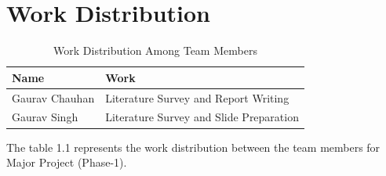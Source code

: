 \section{Work Distribution}
\begin{table}[h]
    \centering
    \caption{Work Distribution Among Team Members}
    \renewcommand{\arraystretch}{1.5}
    \begin{tabular}{|p{5cm}|p{8cm}|}
        \hline
        \textbf{Name}  & \textbf{Work}                           \\
        \hline
        Gaurav Chauhan & Literature Survey and Report Writing    \\
        \hline
        Gaurav Singh   & Literature Survey and Slide Preparation \\
        \hline
    \end{tabular}
\end{table}

The table 1.1 represents the work distribution between the team members for Major Project (Phase-1).